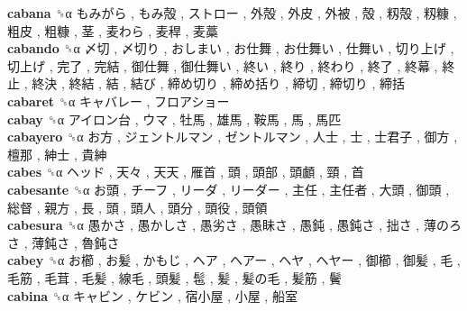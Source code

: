 \textbf{cabana} ␝α   もみがら ,  もみ殻 ,  ストロー ,  外殻 ,  外皮 ,  外被 ,  殻 ,  籾殻 ,  籾糠 ,  粗皮 ,  粗糠 ,  茎 ,  麦わら ,  麦稈 ,  麦藁   \\
\textbf{cabando} ␝α   〆切 ,  〆切り ,  おしまい ,  お仕舞 ,  お仕舞い ,  仕舞い ,  切り上げ ,  切上げ ,  完了 ,  完結 ,  御仕舞 ,  御仕舞い ,  終い ,  終り ,  終わり ,  終了 ,  終幕 ,  終止 ,  終決 ,  終結 ,  結 ,  結び ,  締め切り ,  締め括り ,  締切 ,  締切り ,  締括   \\
\textbf{cabaret} ␝α   キャバレー ,  フロアショー   \\
\textbf{cabay} ␝α   アイロン台 ,  ウマ ,  牡馬 ,  雄馬 ,  鞍馬 ,  馬 ,  馬匹   \\
\textbf{cabayero} ␝α   お方 ,  ジェントルマン ,  ゼントルマン ,  人士 ,  士 ,  士君子 ,  御方 ,  檀那 ,  紳士 ,  貴紳   \\
\textbf{cabes} ␝α   ヘッド ,  天々 ,  天天 ,  雁首 ,  頭 ,  頭部 ,  頭顱 ,  頸 ,  首   \\
\textbf{cabesante} ␝α   お頭 ,  チーフ ,  リーダ ,  リーダー ,  主任 ,  主任者 ,  大頭 ,  御頭 ,  総督 ,  親方 ,  長 ,  頭 ,  頭人 ,  頭分 ,  頭役 ,  頭領   \\
\textbf{cabesura} ␝α   愚かさ ,  愚かしさ ,  愚劣さ ,  愚眛さ ,  愚鈍 ,  愚鈍さ ,  拙さ ,  薄のろさ ,  薄鈍さ ,  魯鈍さ   \\
\textbf{cabey} ␝α   お櫛 ,  お髪 ,  かもじ ,  ヘア ,  ヘアー ,  ヘヤ ,  ヘヤー ,  御櫛 ,  御髪 ,  毛 ,  毛筋 ,  毛茸 ,  毛髪 ,  線毛 ,  頭髪 ,  髢 ,  髪 ,  髪の毛 ,  髪筋 ,  鬢   \\
\textbf{cabina} ␝α   キャビン ,  ケビン ,  宿小屋 ,  小屋 ,  船室   \\
